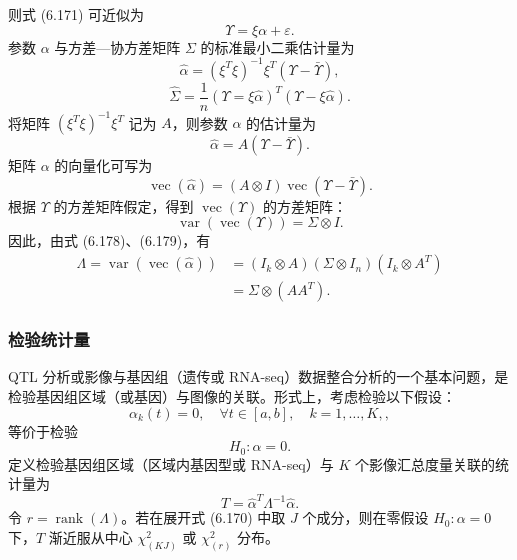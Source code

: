 则式 (6.171) 可近似为
\begin{equation}
\Upsilon=\xi\alpha+\varepsilon.
\tag{6.174}
\end{equation}
参数 $\alpha$ 与方差—协方差矩阵 $\Sigma$ 的标准最小二乘估计量为
\begin{equation}
\widehat\alpha=(\xi^T\xi)^{-1}\xi^T(\Upsilon-\bar\Upsilon),
\tag{6.175}
\end{equation}
\begin{equation}
\widehat\Sigma=\frac1n(\Upsilon=\xi\widehat\alpha)^T(\Upsilon-\xi\widehat\alpha).
\tag{6.176}
\end{equation}
将矩阵 $(\xi^T\xi)^{-1}\xi^T$ 记为 $A$，则参数 $\alpha$ 的估计量为
\begin{equation}
\widehat\alpha=A(\Upsilon-\bar\Upsilon).
\tag{6.177}
\end{equation}
矩阵 $\alpha$ 的向量化可写为
\begin{equation}
\operatorname{vec}(\widehat\alpha)=(A\otimes I)\operatorname{vec}(\Upsilon-\bar\Upsilon).
\tag{6.178}
\end{equation}
根据 $\Upsilon$ 的方差矩阵假定，得到 $\operatorname{vec}(\Upsilon)$ 的方差矩阵：
\begin{equation}
\operatorname{var}(\operatorname{vec}(\Upsilon))=\Sigma\otimes I.
\tag{6.179}
\end{equation}
因此，由式 (6.178)、(6.179)，有
\begin{equation}
\begin{aligned}
\Lambda=\operatorname{var}(\operatorname{vec}(\widehat\alpha))&=(I_k\otimes A)(\Sigma\otimes I_n)(I_k\otimes A^T)\\
&=\Sigma\otimes(AA^T).
\end{aligned}\tag{6.180}
\end{equation}

\subsubsection{检验统计量}

QTL 分析或影像与基因组（遗传或 RNA-seq）数据整合分析的一个基本问题，是检验基因组区域（或基因）与图像的关联。形式上，考虑检验以下假设：
\[
\alpha_k(t)=0,\quad\forall t\in[a,b],\quad k=1,\ldots,K,,
\]
等价于检验
\[
H_0:\alpha=0.
\]
定义检验基因组区域（区域内基因型或 RNA-seq）与 $K$ 个影像汇总度量关联的统计量为
\begin{equation}
T=\widehat\alpha^T\Lambda^{-1}\widehat\alpha.
\tag{6.181}
\end{equation}
令 $r=\operatorname{rank}(\Lambda)$。若在展开式 (6.170) 中取 $J$ 个成分，则在零假设 $H_0:\alpha=0$ 下，$T$ 渐近服从中心 $\chi_{(KJ)}^2$ 或 $\chi_{(r)}^2$ 分布。

